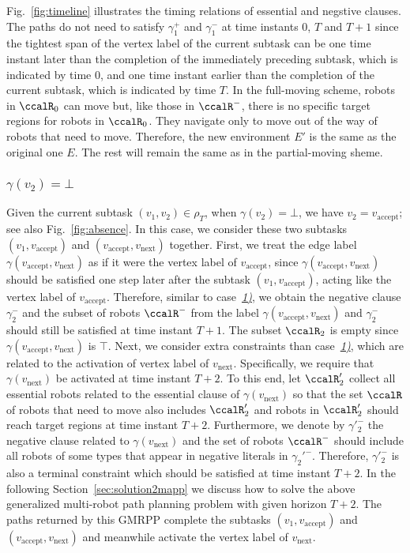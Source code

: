 \documentclass[Afour,sageh,times]{sagej}
\begin{document}
{ Fig.~\ref{fig:timeline} illustrates the timing relations of essential and negstive clauses.  The paths do not need to satisfy  $\gamma_1^+$ and $\gamma_1^-$ at time instants 0,  $T$ and $ T+1$ since the tightest span of the vertex label of the current subtask can be one time instant later than the completion of the immediately preceding subtask, which is indicated by time 0, and one time instant earlier than the completion of the current subtask, which is indicated by time $T$. In the full-moving scheme, robots in $\ccalR_0$ can move but, like those in $\ccalR^-$, there is no specific target regions for robots in $\ccalR_0$. They  navigate only to move out of the way of robots that need to move. Therefore, the new environment $E'$ is the same as the original one $E$. The rest will remain the same as in the partial-moving sheme.



 \subsubsection{$\gamma(v_2)=\bot$}\label{sec:gmmpp2} Given the current subtask $(v_1, v_2) \in \rho_T$, when $\gamma(v_2) = \bot$, we have $v_2 = v_{\text{accept}}$; see also Fig.~\ref{fig:absence}.  In this case, we consider these two subtasks $(v_1, v_{\text{accept}})$ and  $(v_{\text{accept}}, v_{\text{next}})$ together. First, we treat the edge label $\gamma(v_{\text{accept}}, v_{\text{next}})$ as if it were the vertex label of $v_{\text{accept}}$, since $\gamma(v_{\text{accept}}, v_{\text{next}})$ should be satisfied one step later after the subtask $(v_1,  v_{\text{accept}})$, acting like the vertex label of $v_{\text{accept}}$. Therefore, similar to case~\hyperref[sec:gmmpp1]{{\it 1)}}, we obtain the negative clause $\gamma^-_2$ and the subset of robots $\ccalR^-$  from the label $\gamma(v_{\text{accept}}, v_{\text{next}})$ and $\gamma_2^-$ should still be satisfied at time instant $T+1$. The subset $\ccalR_2$ is empty since $\gamma(v_{\text{accept}}, v_{\text{next}})$ is $\top$. Next, we consider extra constraints than case~\hyperref[sec:gmmpp1]{{\it 1)}}, which are related to the activation of vertex label of $v_{\text{next}}$. Specifically, we require that $\gamma(v_{\text{next}})$ be activated at time instant $T+2$. To this end, let $\ccalR'_2$ collect all essential robots related to the  essential clause of $\gamma(v_{\text{next}})$ so that the set $\ccalR$ of robots that need to move also includes $\ccalR'_2$ and robots in $\ccalR'_2$ should reach target regions at time instant $T+2$. Furthermore, we denote by $\gamma'^-_2$ the negative clause related to $\gamma(v_{\text{next}})$ and the set of robots $\ccalR^-$ should include all robots of some types that appear in negative literals in $\gamma_2'^-$. Therefore, $\gamma'^-_2$ is also a terminal constraint which should be satisfied at time instant $T+2$. In the following Section~\ref{sec:solution2mapp} we discuss how to solve the above  generalized multi-robot path planning problem with given horizon  $T+2$. The paths returned by this GMRPP complete the subtasks $(v_1, v_{\text{accept}})$ and  $(v_{\text{accept}}, v_{\text{next}})$  and meanwhile activate the vertex label of $v_{\text{next}}$.

}
\end{document}
